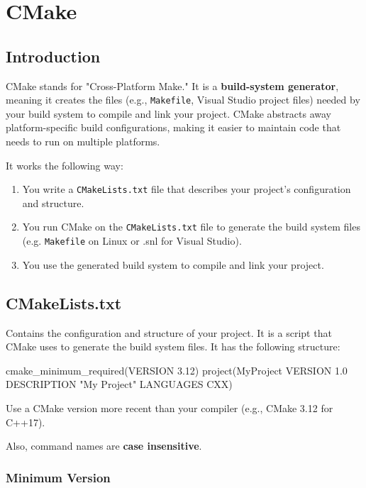 \section{CMake}

\subsection*{Introduction}

CMake stands for "Cross-Platform Make." It is a \textbf{build-system generator}, meaning it creates the files (e.g., \texttt{Makefile}, Visual Studio project files) needed by your build system to compile and link your project.
CMake abstracts away platform-specific build configurations, making it easier to maintain code that needs to run on multiple platforms.

It works the following way:
\begin{enumerate}
    \item You write a \texttt{CMakeLists.txt} file that describes your project's configuration and structure.
    \item You run CMake on the \texttt{CMakeLists.txt} file to generate the build system files (e.g. \texttt{Makefile} on Linux or .snl for Visual Studio).
    \item You use the generated build system to compile and link your project.
\end{enumerate}

\subsection*{CMakeLists.txt}

Contains the configuration and structure of your project. It is a script that CMake uses to generate the build system files.
It has the following structure:

\begin{codeblock}[language=bash]
cmake_minimum_required(VERSION 3.12) 
project(MyProject VERSION 1.0
    DESCRIPTION "My Project"
    LANGUAGES CXX)
\end{codeblock}

\begin{warningblock}
    Use a CMake version more recent than your compiler (e.g., CMake 3.12 for C++17).

    Also, command names are \textbf{case insensitive}.
\end{warningblock}

\subsubsection{Minimum Version}

